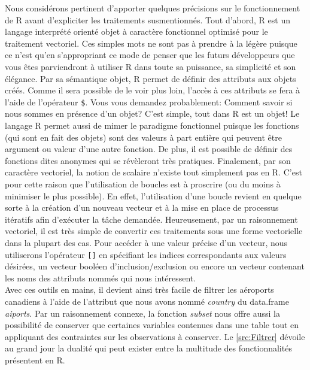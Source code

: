 Nous considérons pertinent d'apporter quelques précisions sur le fonctionnement de R avant d'expliciter les traitements susmentionnés. Tout d'abord, R est un langage interprété orienté objet à caractère fonctionnel optimisé pour le traitement vectoriel. Ces simples mots ne sont pas à prendre à la légère puisque ce n'est qu'en s'appropriant ce mode de penser que les futurs développeurs que vous êtes parviendront à utiliser R dans toute sa puissance, sa simplicité et son élégance. Par sa sémantique objet, R permet de définir des attributs aux objets créés. Comme il sera possible de le voir plus loin, l'accès à ces attributs se fera à l'aide de l'opérateur \texttt{\$}. Vous vous demandez probablement: Comment savoir si nous sommes en présence d'un objet? C'est simple, tout dans R est un objet! Le langage R permet aussi de mimer le paradigme fonctionnel puisque les fonctions (qui sont en fait des objets) sont des valeurs à part entière qui peuvent être argument ou valeur d'une autre fonction. De plus, il est possible de définir des fonctions dites anonymes qui se révèleront très pratiques. Finalement, par son caractère vectoriel, la notion de scalaire n'existe tout simplement pas en R. C'est pour cette raison que l'utilisation de boucles est à proscrire (ou du moins à minimiser le plus possible). En effet, l'utilisation d'une boucle revient en quelque sorte à la création d'un nouveau vecteur et à la mise en place de processus itératifs afin d'exécuter la tâche demandée. Heureusement, par un raisonnement vectoriel, il est très simple de convertir ces traitements sous une forme vectorielle dans la plupart des cas. \cite{Goulet} Pour accéder à une valeur précise d'un vecteur, nous utiliserons l'opérateur \texttt{[]} en spécifiant les indices correspondants aux valeurs désirées, un vecteur booléen d'inclusion/exclusion ou encore un vecteur contenant les noms des attributs nommés qui nous intéressent. \\

Avec ces outils en mains, il devient ainsi très facile de filtrer les aéroports canadiens à l'aide de l'attribut que nous avons nommé \emph{country} du data.frame \emph{aiports}. Par un raisonnement connexe, la fonction \emph{subset} \cite{Rfunction:subset} nous offre aussi la possibilité de conserver que certaines variables contenues dans une table tout en appliquant des contraintes sur les observations à conserver. Le \autoref{src:Filtrer} dévoile au grand jour la dualité qui peut exister entre la multitude des fonctionnalités présentent en R. \\

